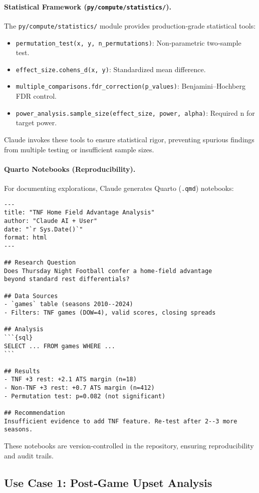 \paragraph{Statistical Framework (\texttt{py/compute/statistics/}).}
The \texttt{py/compute/statistics/} module provides production‑grade statistical tools:
\begin{itemize}
\item \texttt{permutation\_test(x, y, n\_permutations)}: Non‑parametric two‑sample test.
\item \texttt{effect\_size.cohens\_d(x, y)}: Standardized mean difference.
\item \texttt{multiple\_comparisons.fdr\_correction(p\_values)}: Benjamini--Hochberg FDR control.
\item \texttt{power\_analysis.sample\_size(effect\_size, power, alpha)}: Required n for target power.
\end{itemize}

Claude invokes these tools to ensure statistical rigor, preventing spurious findings from multiple testing or insufficient sample sizes.

\paragraph{Quarto Notebooks (Reproducibility).}
For documenting explorations, Claude generates Quarto (\texttt{.qmd}) notebooks:
\begin{verbatim}
---
title: "TNF Home Field Advantage Analysis"
author: "Claude AI + User"
date: "`r Sys.Date()`"
format: html
---

## Research Question
Does Thursday Night Football confer a home-field advantage
beyond standard rest differentials?

## Data Sources
- `games` table (seasons 2010--2024)
- Filters: TNF games (DOW=4), valid scores, closing spreads

## Analysis
```{sql}
SELECT ... FROM games WHERE ...
```

## Results
- TNF +3 rest: +2.1 ATS margin (n=18)
- Non-TNF +3 rest: +0.7 ATS margin (n=412)
- Permutation test: p=0.082 (not significant)

## Recommendation
Insufficient evidence to add TNF feature. Re-test after 2--3 more seasons.
\end{verbatim}

These notebooks are version‑controlled in the repository, ensuring reproducibility and audit trails.

\subsection{Use Case 1: Post‑Game Upset Analysis}
\label{subsec:use_case_upset}

